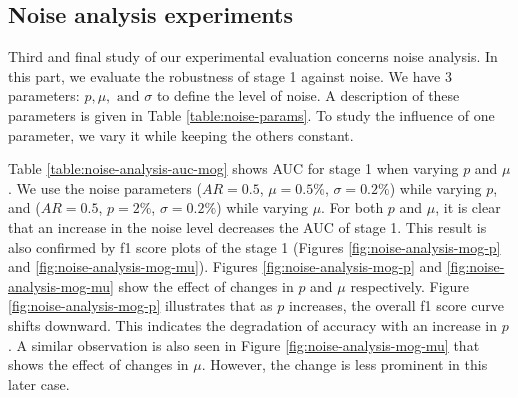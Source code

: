 \vspace{5pt}
\subsection{Noise analysis experiments}
Third and final study of our experimental evaluation concerns noise analysis. In this part, we evaluate the robustness of stage 1 against noise. We have 3 parameters: $p, \mu, \text{ and } \sigma$ to define the level of noise. A description of these parameters is given in Table \ref{table:noise-params}. To study the influence of one parameter, we vary it while keeping the others constant. 

Table \ref{table:noise-analysis-auc-mog} shows AUC for stage 1 when varying $p$ and $\mu$. We use the noise parameters ($AR=0.5$, $\mu=0.5\%$, $\sigma=0.2\%$) while varying $p$, and ($AR=0.5$, $p=2\%$, $\sigma=0.2\%$) while varying $\mu$. For both $p$ and $\mu$, it is clear that an increase in the noise level decreases the AUC of stage 1.  This result is also confirmed by f1 score plots of the stage 1 (Figures \ref{fig:noise-analysis-mog-p} and \ref{fig:noise-analysis-mog-mu}). Figures \ref{fig:noise-analysis-mog-p} and \ref{fig:noise-analysis-mog-mu} show the effect of changes in $p$ and $\mu$ respectively. Figure \ref{fig:noise-analysis-mog-p} illustrates that as $p$ increases, the overall f1 score curve shifts downward. This indicates the degradation of accuracy with an increase in $p$. A similar observation is also seen in Figure \ref{fig:noise-analysis-mog-mu} that shows the effect of changes in $\mu$. However, the change is less prominent in this later case.  


